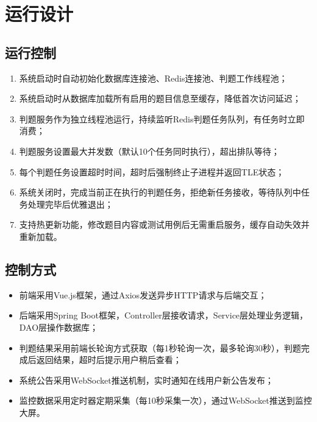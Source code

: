 \documentclass{../template/softeng}
\begin{document}
\section{运行设计}

\subsection{运行控制}
\begin{enumerate}
	\item 系统启动时自动初始化数据库连接池、Redis连接池、判题工作线程池；
	\item 系统启动时从数据库加载所有启用的题目信息至缓存，降低首次访问延迟；
	\item 判题服务作为独立线程池运行，持续监听Redis判题任务队列，有任务时立即消费；
	\item 判题服务设置最大并发数（默认10个任务同时执行），超出排队等待；
	\item 每个判题任务设置超时时间，超时后强制终止子进程并返回TLE状态；
	\item 系统关闭时，完成当前正在执行的判题任务，拒绝新任务接收，等待队列中任务处理完毕后优雅退出；
	\item 支持热更新功能，修改题目内容或测试用例后无需重启服务，缓存自动失效并重新加载。
\end{enumerate}

\subsection{控制方式}
\begin{itemize}
	\item 前端采用Vue.js框架，通过Axios发送异步HTTP请求与后端交互；
	\item 后端采用Spring Boot框架，Controller层接收请求，Service层处理业务逻辑，DAO层操作数据库；
	\item 判题结果采用前端长轮询方式获取（每1秒轮询一次，最多轮询30秒），判题完成后返回结果，超时后提示用户稍后查看；
	\item 系统公告采用WebSocket推送机制，实时通知在线用户新公告发布；
	\item 监控数据采用定时器定期采集（每10秒采集一次），通过WebSocket推送到监控大屏。
\end{itemize}
\end{document}
